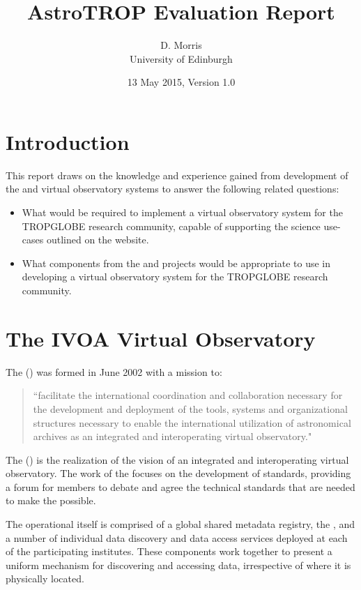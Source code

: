 \documentclass{article}
\title{AstroTROP Evaluation Report}
\author{D. Morris \\
University of Edinburgh}
\date{13 May 2015, Version 1.0}
\begin{document}
\maketitle

\section{Introduction}

This report draws on the knowledge and experience gained from development
of the \cite{astro} and \cite{ivoa} virtual observatory systems to answer
the following related questions:

\begin{itemize}
    \item What would be required to implement a virtual observatory system
    for the TROPGLOBE research community, capable of supporting the science
    use-cases outlined on the \cite{trop} website.
    \item What components from the \cite{astro} and \cite{ivoa} projects
    would be appropriate to use in developing a virtual observatory system
    for the TROPGLOBE research community.
\end{itemize}

\section{The IVOA Virtual Observatory}

The  (\cite{ivoa}) was formed in June 2002 with a mission to:
\begin{quote}
``facilitate the international coordination and collaboration necessary for
the development and deployment of the tools, systems and organizational
structures necessary to enable the international utilization of astronomical
archives as an integrated and interoperating virtual observatory."
\end{quote}

The  (\cite{vo}) is the realization of the \cite{ivoa} vision
of an integrated and interoperating virtual observatory.
The work of the \cite{ivoa} focuses on the development of standards,
providing a forum for members to debate and agree the technical standards
that are needed to make the \cite{vo} possible.

The operational \cite{vo} itself is comprised of a global shared metadata
registry, the \cite{ivoa-reg}, and a number of individual data discovery
and data access services deployed at each of the participating institutes.
These components work together to present a uniform mechanism for discovering
and accessing data, irrespective of where it is physically located.
\end{document}
